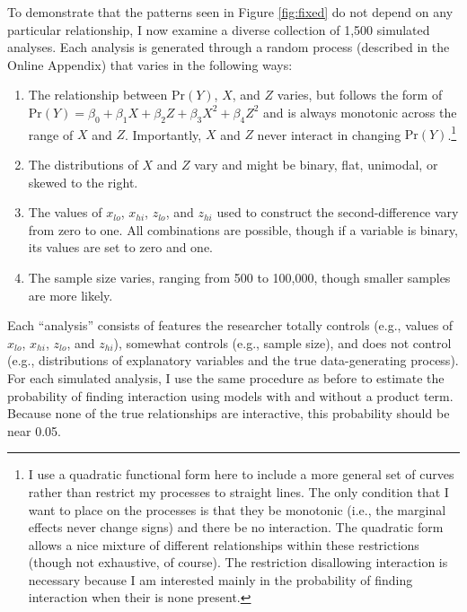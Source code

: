 \documentclass[12pt]{article}
\begin{document}
To demonstrate that the patterns seen in Figure \ref{fig:fixed} do not depend on any particular relationship, I now examine a diverse collection of 1,500 simulated analyses. Each analysis is generated through a random process (described in the Online Appendix) that varies in the following ways:\singlespace\vspace{-3mm}
\begin{enumerate}
\item The relationship between $\text{Pr}(Y)$, $X$, and $Z$ varies, but follows the form of $\text{Pr}(Y) = \beta_0 + \beta_1X + \beta_2Z + \beta_3X^2 + \beta_4Z^2$ and is always monotonic across the range of $X$ and $Z$. Importantly, $X$ and $Z$ never interact in changing $\text{Pr}(Y)$.\footnote{I use a quadratic functional form here to include a more general set of curves rather than restrict my processes to straight lines. The only condition that I want to place on the processes is that they be monotonic (i.e., the marginal effects never change signs) and there be no interaction. The quadratic form allows a nice mixture of different relationships within these restrictions (though not exhaustive, of course). The restriction disallowing interaction is necessary because I am interested mainly in the probability of finding interaction when their is none present.}
\item The distributions of $X$ and $Z$ vary and might be binary, flat, unimodal, or  skewed to the right.
\item The values of $x_{lo}$, $x_{hi}$, $z_{lo}$, and $z_{hi}$ used to construct the second-difference vary from zero to one. All combinations are possible, though if a variable is binary, its values are set to zero and one.
\item The sample size varies, ranging from 500 to 100,000, though smaller samples are more likely.


\end{enumerate}
\doublespace
Each ``analysis'' consists of features the researcher totally controls (e.g., values of $x_{lo}$, $x_{hi}$, $z_{lo}$, and $z_{hi}$), somewhat controls (e.g., sample size), and does not control (e.g., distributions of explanatory variables and the true data-generating process). For each simulated analysis, I use the same procedure as before to estimate the probability of finding interaction using models with and without a product term. Because none of the true relationships are interactive, this probability should be near 0.05. 
\end{document}
